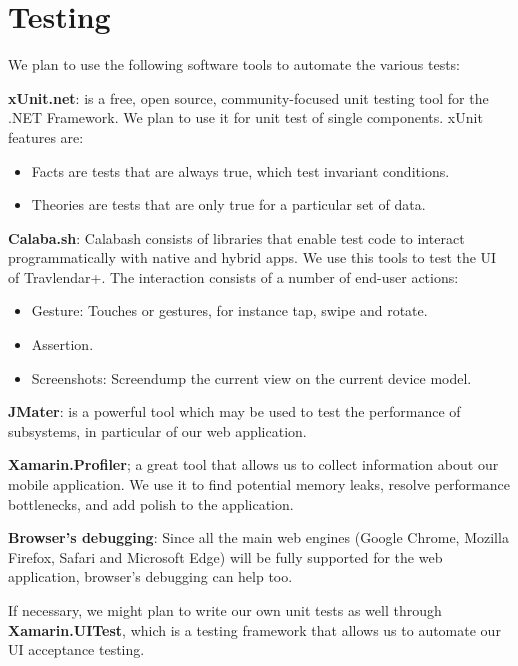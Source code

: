 \section*{Testing}
We plan to use the following software tools to automate the various tests:
\begin{description}
\item \textbf{xUnit.net}: is a free, open source, community-focused unit testing tool for the .NET Framework. 
We plan to use it for unit test of single components. xUnit features are:
\begin{itemize}
\item Facts are tests that are always true, which test invariant conditions.
\item Theories are tests that are only true for a particular set of data.
\end{itemize}
\item \textbf{Calaba.sh}: Calabash consists of libraries that enable test code to interact programmatically with native and hybrid apps. We use this tools to test the UI of Travlendar+. The interaction consists of a number of end-user actions:
\begin{itemize}
\item Gesture: Touches or gestures, for instance tap, swipe and rotate.
\item Assertion.
\item Screenshots: Screendump the current view on the current device model.
\end{itemize}
\item \textbf{JMater}: is a powerful tool which may be used to test the performance of subsystems, in particular of our web application.
\item \textbf{Xamarin.Profiler}; a great tool that allows us to collect information about our mobile application. We use it to find potential memory leaks, resolve performance bottlenecks, and add polish to the application.
\item \textbf{Browser's debugging}: Since all the main web engines (Google Chrome, Mozilla Firefox, Safari and Microsoft Edge) will be fully supported for the web application, browser's debugging can help too.
\end{description}
If necessary, we might plan to write our own unit tests as well through \textbf{Xamarin.UITest}, which is a testing framework that allows us to automate our UI acceptance testing. 


 


